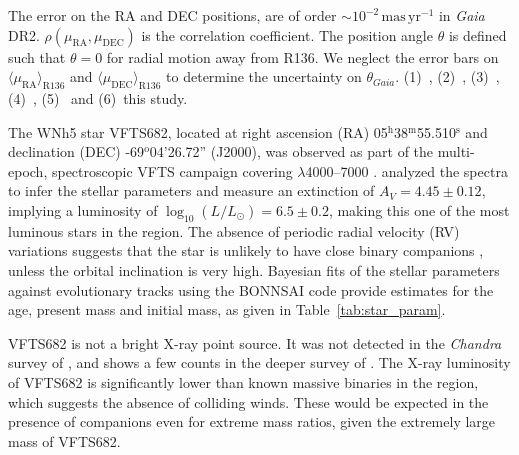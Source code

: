 \documentclass[a4paper,fleqn,usenatbib]{mnras}
\newcommand{\kms}{{\,\mathrm{km\ s^{-1}}}}
\newcommand{\masyr}{\,\mathrm{mas}\,\mathrm{yr}^{-1}}
\DeclareRobustCommand{\Tabref}[1]{Table~\ref{#1}}
\begin{document}
\begin{table}
\begin{center}
    {\tiny The error on the RA and DEC positions, are of order
      $\sim$$10^{-2}\masyr$ in \emph{Gaia}
      DR2. $\rho(\mu_\mathrm{RA},\mu_\mathrm{DEC})$ is the
      correlation coefficient. The position angle
      $\theta$ is defined such that $\theta=0$ for radial motion
      away from R136. We neglect the error bars on
      $\langle\mu_\mathrm{RA}\rangle_\mathrm{R136}$ and $\langle\mu_\mathrm{DEC}\rangle_\mathrm{R136}$ to determine the uncertainty
      on $\theta_{Gaia}$.
      (1)~\cite{brown:18},
      (2)~\cite{henault-brunet:12},
      (3)~\cite{bestenlehner:11},
      (4)~\cite{lennon:18}, 
      (5)~\cite{platais:18} and
      (6)~{\color{blue}this study}.
    }
  \end{center}
  \label{tab:vfts682}
\end{table}


The WNh5 star VFTS682, located at right ascension (RA)
05$^\mathrm{h}$38$^\mathrm{m}$55.510$^\mathrm{s}$  and declination
(DEC) \mbox{-69$^\mathrm{o}$04'26.72''} (J2000), was observed as part of the multi-epoch, spectroscopic VFTS campaign covering $\lambda$4000--7000 \citep[][]{evans:11}. 
\citet{bestenlehner:11}  analyzed the spectra to infer the stellar
parameters and measure an extinction of $A_V=4.45\pm0.12$, implying a
luminosity of $\log_{10}(L/L_\odot) =  6.5\pm0.2$, making this one of
the most luminous stars in the region. The absence of periodic radial
velocity (RV)
variations suggests that the star is unlikely to have close binary
companions \citep[][]{bestenlehner:11}, unless the orbital inclination is
very high. Bayesian fits of the stellar
parameters against evolutionary tracks \citep{brott:11, kohler:15}
using the BONNSAI code \citep{schneider:14,schneider:17} provide
estimates for the age, present mass and initial mass, %
as given in \Tabref{tab:star_param}. %

VFTS682 is not a bright X-ray point source. It was not detected in the
\emph{Chandra} survey of \cite{townsley:06}, and shows a few counts in
the deeper survey of \cite{townsley:14}.
The X-ray luminosity of VFTS682
is significantly lower than known massive binaries in the region, which suggests the absence of
colliding winds. These would be expected in the presence of companions
even for extreme mass ratios, given the extremely large mass of
VFTS682.
\end{document}
